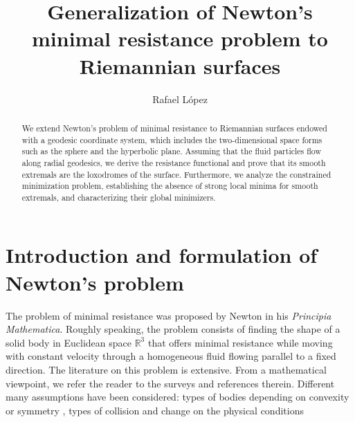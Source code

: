 \documentclass[a4paper,12pt]{amsart}
\theoremstyle{definition}
\def\r{\mathbb R}
\begin{document}
\title[Newton's minimal resistance problem on Riemannian surfaces]{Generalization of Newton's minimal resistance problem to Riemannian surfaces}
\author{Rafael L\'opez}
\address{Department of Geometry and Topology. University of Granada.   18071 Granada, Spain}
\begin{abstract}
We extend Newton's problem of minimal resistance to Riemannian surfaces endowed with a geodesic     coordinate system, which includes the two-dimensional space forms such as the sphere  and the hyperbolic plane. Assuming that the fluid particles flow along radial geodesics, we derive the resistance functional and prove that its smooth extremals are the loxodromes of the surface. Furthermore, we analyze the constrained minimization problem, establishing the absence of strong local minima for smooth extremals, and   characterizing their global minimizers.
 \end{abstract}

 

\maketitle

\section{Introduction and formulation of Newton's problem}
 


The problem of minimal resistance was proposed by Newton in his {\it Principia Mathematica}. Roughly speaking, the  problem consists of finding the shape of a solid body in Euclidean space $\r^3$ that offers minimal resistance while moving with constant velocity through a homogeneous fluid flowing parallel to a fixed direction. The literature on this problem is extensive. From a mathematical viewpoint, we refer the reader to the surveys \cite{bu,bk} and references therein. Different many assumptions have been considered: types of bodies depending on convexity or symmetry \cite{bfk,bfk2,ch1,ch2}, types of collision \cite{ch1,py1,py2} and change on the physical conditions \cite{hkv,lo1,lo2}
\end{document}
